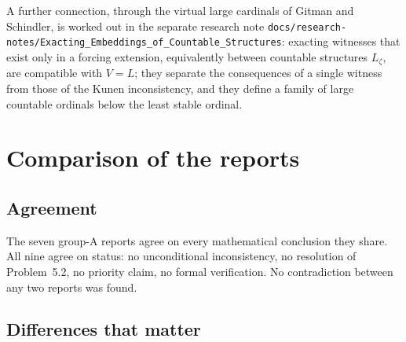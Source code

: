 \documentclass[11pt,letterpaper]{article}
\theoremstyle{definition}
\numberwithin{equation}{section}
\begin{document}
A further connection, through the virtual large cardinals of Gitman and Schindler, is worked out in the separate research note \nolinkurl{docs/research-notes/Exacting_Embeddings_of_Countable_Structures}: exacting witnesses that exist only in a forcing extension, equivalently between countable structures $L_\zeta$, are compatible with $V=L$; they separate the consequences of a single witness from those of the Kunen inconsistency, and they define a family of large countable ordinals below the least stable ordinal.

\section{Comparison of the reports}\label{sec:compare}

\subsection{Agreement}

The seven group-A reports agree on every mathematical conclusion they share. All nine agree on status: no unconditional inconsistency, no resolution of Problem~5.2, no priority claim, no formal verification. No contradiction between any two reports was found.

\subsection{Differences that matter}
\end{document}
